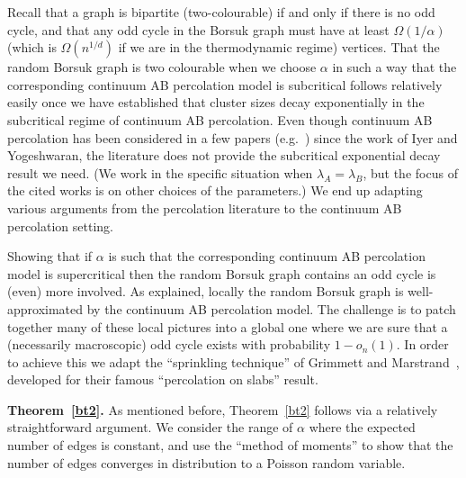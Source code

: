 \documentclass[11pt]{article}%
\begin{document}
Recall that a graph is bipartite (two-colourable) if and only if there is no odd cycle, and that 
any odd cycle in the Borsuk graph must have at least $\Omega(1/\alpha)$ (which is $\Omega( n^{1/d} )$ 
if we are in the thermodynamic regime) vertices.
That the random Borsuk graph is two colourable when we choose $\alpha$ in such a way that the corresponding continuum AB percolation 
model is subcritical follows relatively easily once we have established that 
cluster sizes decay exponentially in the subcritical regime of continuum AB percolation.
Even though continuum AB percolation has been considered in a few papers (e.g.~\cite{PenroseAB,DereudrePenrose}) 
since the work of Iyer and Yogeshwaran, the literature does not provide the subcritical exponential decay result we need. 
(We work in the specific situation when $\lambda_A=\lambda_B$, but the focus of the cited works is on 
other choices of the parameters.) We end up adapting various arguments from the percolation literature
to the continuum AB percolation setting.

Showing that if $\alpha$ is such that the corresponding continuum AB percolation model is supercritical 
then the random Borsuk graph contains an odd cycle is (even) more involved.
As explained, locally the random Borsuk graph is well-approximated by the continuum AB percolation model.
The challenge is to patch together many of these local pictures into a global one where we are sure 
that a (necessarily macroscopic) odd cycle exists with probability $1-o_n(1)$.
In order to achieve this we adapt the ``sprinkling technique'' of 
Grimmett and Marstrand~\cite{GrimmettMarstrand1990Supercritical}, developed for their famous 
``percolation on slabs'' result.

\vspace{1ex}

{\bf Theorem~\ref{bt2}.} As mentioned before, Theorem~\ref{bt2} follows via a relatively straightforward argument. 
We consider the range of $\alpha$ where the expected number of edges is 
constant, and use the ``method of moments'' to show that the number of edges converges in distribution to a 
Poisson random variable.

\vspace{1ex}
\end{document}
